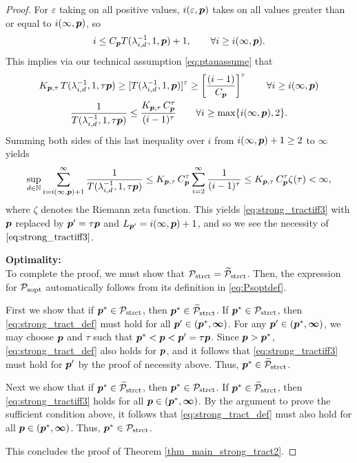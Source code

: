 \documentclass[11pt,a4paper]{article}
\newcommand{\vinfty}{\boldsymbol{\infty}}
\begin{document}
\begin{proof}
For $\varepsilon$ taking on all positive values, $i(\varepsilon,\boldsymbol{p})$ takes on all values greater than or equal to $i(\infty,\boldsymbol{p})$, so
\[
i\le C_{\boldsymbol{p}} T(\lambda_{i,d}^{-1},1,\boldsymbol{p})+1, \qquad \forall i \ge i(\infty,\boldsymbol{p}).
\]
This implies via our technical assumption \eqref{eq:ptauassume} that
\begin{gather*}
 K_{\boldsymbol{p},\tau}\,T (\lambda_{i,d}^{-1},1,\tau \boldsymbol{p}) \ge
 [T(\lambda_{i,d}^{-1},1, \boldsymbol{p})]^\tau
 \ge
  \left[\frac{(i-1)}{C_{\boldsymbol{p}}}\right]^\tau \qquad \forall i \ge i(\infty,\boldsymbol{p}) \\
 \frac{1}{T (\lambda_{i,d}^{-1},1,\tau \boldsymbol{p})} \le
\frac{K_{\boldsymbol{p},\tau}\, C_{\boldsymbol{p}}^\tau}{(i-1)^\tau}\qquad \forall i \ge \max\{i(\infty,\boldsymbol{p}),2\} .
\end{gather*}
Summing both sides of this last inequality over $i$ from $i(\infty,\boldsymbol{p}) +1 \ge 2$ to $\vinfty$ yields
\begin{equation*}
\sup_{d\in\mathbb{N}} \sum_{i=i(\infty,\boldsymbol{p}) +1 }^\infty \frac{1}{T (\lambda_{i,d}^{-1},1, \tau \boldsymbol{p})}
 \le  K_{\boldsymbol{p},\tau}\, C_{\boldsymbol{p}}^\tau
\sum_{i=2}^\infty \frac{1}{(i-1)^\tau} \\
 \le K_{\boldsymbol{p},\tau}\, C_{\boldsymbol{p}}^\tau
\zeta (\tau)  < \infty,
\end{equation*}
where $\zeta$ denotes the Riemann zeta function.
This yields \eqref{eq:strong_tractiff3} with $\boldsymbol{p}$ replaced by $\boldsymbol{p}' = \tau \boldsymbol{p}$ and $L_{\boldsymbol{p}'} = i(\infty,\boldsymbol{p}) +1$, and so we see the necessity of $\eqref{eq:strong_tractiff3}$.

\bigskip
\noindent \textbf{Optimality:} \\
To complete the proof, we must show that $\mathcal{P}_{\textup{strct}} = \widetilde{\mathcal{P}}_{\textup{strct}}$.  Then, the expression for  $\mathcal{P}_{\textup{sopt}}$ automatically follows from its definition in \eqref{eq:Psoptdef}.

First we show  that if $\boldsymbol{p}^* \in \mathcal{P}_{\textup{strct}}$, then $\boldsymbol{p}^* \in \widetilde{\mathcal{P}}_{\textup{strct}}$.  If $\boldsymbol{p}^* \in \mathcal{P}_{\textup{strct}}$, then \eqref{eq:strong_tract_def} must hold for all $\vp' \in (\vp^*,\vinfty)$.  For any $\vp' \in (\vp^*,\vinfty)$, we may choose $\boldsymbol{p}$ and $\tau$ such that $\boldsymbol{p}^* < \boldsymbol{p} < \boldsymbol{p}' = \tau \boldsymbol{p}$. Since $\boldsymbol{p} > \boldsymbol{p}^*$, \eqref{eq:strong_tract_def} also holds for $\boldsymbol{p}$, and it follows that \eqref{eq:strong_tractiff3} must hold for $\boldsymbol{p}'$ by the proof of necessity above.  Thus, $\boldsymbol{p}^* \in \widetilde{\mathcal{P}}_{\textup{strct}}$.

Next we show that if $\boldsymbol{p}^* \in \widetilde{\mathcal{P}}_{\textup{strct}}$, then $\boldsymbol{p}^* \in \mathcal{P}_{\textup{strct}}$.  If $\boldsymbol{p}^* \in \widetilde{\mathcal{P}}_{\textup{strct}}$, then \eqref{eq:strong_tractiff3}  holds for all $\vp \in (\vp^*,\vinfty)$.  By the argument to prove the sufficient condition above, it follows that \eqref{eq:strong_tract_def} must also hold for all $\vp \in (\vp^*,\vinfty)$. Thus, $\boldsymbol{p}^* \in \mathcal{P}_{\textup{strct}}$.

\bigskip

\noindent This concludes the proof of  Theorem \ref{thm_main_strong_tract2}.

\end{proof}
\end{document}
